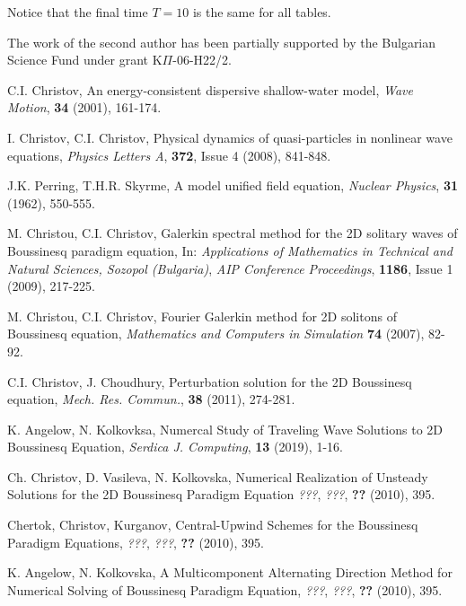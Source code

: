 \documentclass[%
 aip,
cp,  %
 amsmath,amssymb,%
 reprint,%
]{revtex4-2}
\begin{document}
Notice that the final time $T=10$  is the same for all tables.

\begin{acknowledgments}
The work of the second author has been partially supported by
the Bulgarian Science Fund under grant K$\Pi$-06-H22/2.
\end{acknowledgments}


\begin{thebibliography}{99} \normalsize

 C.I. Christov, An energy-consistent dispersive shallow-water model,  {\it Wave Motion}, \textbf{34} (2001), 161-174.

 I. Christov, C.I. Christov, Physical dynamics of quasi-particles in nonlinear wave equations,
{\it Physics Letters A}, \textbf{372}, Issue 4 (2008),  841-848.

 J.K. Perring, T.H.R. Skyrme, A model unified field equation, {\it Nuclear Physics},  \textbf{31} (1962), 550-555.

   M. Christou, C.I. Christov,
Galerkin spectral method for the 2D solitary waves of Boussinesq paradigm equation,
In: {\it Applications of Mathematics in Technical and Natural Sciences, Sozopol (Bulgaria)},
\emph{AIP Conference Proceedings}, \textbf{1186}, Issue 1 (2009), 217-225.

  M. Christou, C.I. Christov,
Fourier Galerkin method for 2D solitons of Boussinesq equation,
{\it Mathematics and Computers in Simulation} \textbf{74} (2007), 82-92.

 C.I. Christov, J. Choudhury, Perturbation solution for the 2D Boussinesq equation, {\it Mech. Res. Commun.}, \textbf{38} (2011), 274-281.

  K. Angelow, N. Kolkovksa, Numercal Study of Traveling Wave Solutions to 2D Boussinesq Equation, {\it Serdica J. Computing}, \textbf{13} (2019), 1-16.

 Ch. Christov, D. Vasileva, N. Kolkovska, Numerical Realization of Unsteady Solutions for the 2D Boussinesq Paradigm Equation
{\it ???},
\emph{???}, \textbf{??} (2010), 395.

 Chertok, Christov, Kurganov, Central-Upwind Schemes for the Boussinesq Paradigm Equations,
{\it ???},
\emph{???}, \textbf{??} (2010), 395.

 K. Angelow, N. Kolkovska, A Multicomponent Alternating Direction Method for Numerical Solving of Boussinesq Paradigm Equation,
{\it ???},
\emph{???}, \textbf{??} (2010), 395.


\end{thebibliography}
\end{document}
